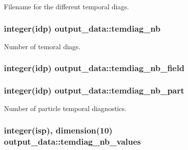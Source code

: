 Filename for the different temporal diags. 

\subsubsection[{\texorpdfstring{temdiag\+\_\+nb}{temdiag_nb}}]{\setlength{\rightskip}{0pt plus 5cm}integer(idp) output\+\_\+data\+::temdiag\+\_\+nb}\hypertarget{namespaceoutput__data_a996655a7d030216dcce6367a59b22ae8}{}\label{namespaceoutput__data_a996655a7d030216dcce6367a59b22ae8}


Number of temoral diags. 

\subsubsection[{\texorpdfstring{temdiag\+\_\+nb\+\_\+field}{temdiag_nb_field}}]{\setlength{\rightskip}{0pt plus 5cm}integer(idp) output\+\_\+data\+::temdiag\+\_\+nb\+\_\+field}\hypertarget{namespaceoutput__data_a6e3150da1e4314b418b4f40c56737551}{}\label{namespaceoutput__data_a6e3150da1e4314b418b4f40c56737551}
\subsubsection[{\texorpdfstring{temdiag\+\_\+nb\+\_\+part}{temdiag_nb_part}}]{\setlength{\rightskip}{0pt plus 5cm}integer(idp) output\+\_\+data\+::temdiag\+\_\+nb\+\_\+part}\hypertarget{namespaceoutput__data_a950d70a052698f77988f39da1fddf632}{}\label{namespaceoutput__data_a950d70a052698f77988f39da1fddf632}


Number of particle temporal diagnostics. 

\subsubsection[{\texorpdfstring{temdiag\+\_\+nb\+\_\+values}{temdiag_nb_values}}]{\setlength{\rightskip}{0pt plus 5cm}integer(isp), dimension(10) output\+\_\+data\+::temdiag\+\_\+nb\+\_\+values}\hypertarget{namespaceoutput__data_a2c62698838d0295802c6b2a6637c3827}{}\label{namespaceoutput__data_a2c62698838d0295802c6b2a6637c3827}


